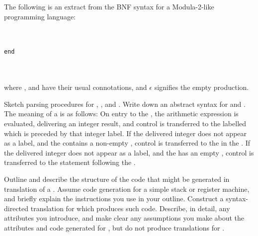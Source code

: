 \begin{questions}
The following is an extract from the BNF syntax for
a Modula-2-like programming language:
\begin{bnf}
\\
 \\
 \verb"end"\\
\\
\\
\end{bnf}
where ,  and  have their usual connotations,
and $\epsilon$ signifies the empty production.
\begin{subquestions}
\subquestion
Sketch parsing procedures for , ,
 and .
\subsubquestion
Write down an abstract syntax for  and .
\subquestion
The meaning of a  is as follows:
On entry to the , 
the arithmetic expression  is evaluated,
delivering an integer result, and control is transferred to
the labelled  which is preceded by that integer
label. If the delivered integer does not appear as a label,
and the  contains a non-empty ,
control is transferred to the  in the .
If the delivered integer does not appear as a label,
and the  has an empty , 
control is transferred to the statement following the .
\begin{subsubquestions}
\subsubquestion
	Outline and describe the structure of the
        code that might be generated in translation of
        a .  Assume code generation for a simple
        stack or register machine, and briefly explain the
	instructions you use in your outline.
\subsubquestion
        Construct a syntax-directed translation for 
         which produces such code.
        Describe, in detail, any attributes you
        introduce, and make clear any assumptions you make about 
        the attributes and code generated for , 
	but do not produce translations for .
\end{subsubquestions}
\end{subquestions}


\end{questions}
